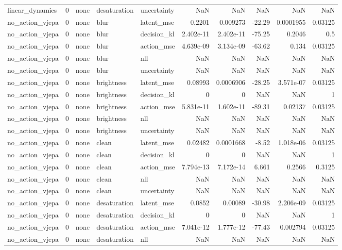 \begin{tabular}{lrlllrrrrr}
linear\_dynamics & 0 & none & desaturation & uncertainty & NaN & NaN & NaN & NaN & NaN \\
no\_action\_vjepa & 0 & none & blur & latent\_mse & 0.2201 & 0.009273 & -22.29 & 0.0001955 & 0.03125 \\
no\_action\_vjepa & 0 & none & blur & decision\_kl & 2.402e-11 & 2.402e-11 & -75.25 & 0.2046 & 0.5 \\
no\_action\_vjepa & 0 & none & blur & action\_mse & 4.639e-09 & 3.134e-09 & -63.62 & 0.134 & 0.03125 \\
no\_action\_vjepa & 0 & none & blur & nll & NaN & NaN & NaN & NaN & NaN \\
no\_action\_vjepa & 0 & none & blur & uncertainty & NaN & NaN & NaN & NaN & NaN \\
no\_action\_vjepa & 0 & none & brightness & latent\_mse & 0.08993 & 0.0006906 & -28.25 & 3.571e-07 & 0.03125 \\
no\_action\_vjepa & 0 & none & brightness & decision\_kl & 0 & 0 & NaN & NaN & 1 \\
no\_action\_vjepa & 0 & none & brightness & action\_mse & 5.831e-11 & 1.602e-11 & -89.31 & 0.02137 & 0.03125 \\
no\_action\_vjepa & 0 & none & brightness & nll & NaN & NaN & NaN & NaN & NaN \\
no\_action\_vjepa & 0 & none & brightness & uncertainty & NaN & NaN & NaN & NaN & NaN \\
no\_action\_vjepa & 0 & none & clean & latent\_mse & 0.02482 & 0.0001668 & -8.52 & 1.018e-06 & 0.03125 \\
no\_action\_vjepa & 0 & none & clean & decision\_kl & 0 & 0 & NaN & NaN & 1 \\
no\_action\_vjepa & 0 & none & clean & action\_mse & 7.794e-13 & 7.172e-14 & 6.661 & 0.2566 & 0.3125 \\
no\_action\_vjepa & 0 & none & clean & nll & NaN & NaN & NaN & NaN & NaN \\
no\_action\_vjepa & 0 & none & clean & uncertainty & NaN & NaN & NaN & NaN & NaN \\
no\_action\_vjepa & 0 & none & desaturation & latent\_mse & 0.0852 & 0.00089 & -30.98 & 2.206e-09 & 0.03125 \\
no\_action\_vjepa & 0 & none & desaturation & decision\_kl & 0 & 0 & NaN & NaN & 1 \\
no\_action\_vjepa & 0 & none & desaturation & action\_mse & 7.041e-12 & 1.777e-12 & -77.43 & 0.002794 & 0.03125 \\
no\_action\_vjepa & 0 & none & desaturation & nll & NaN & NaN & NaN & NaN & NaN \\

\end{tabular}
